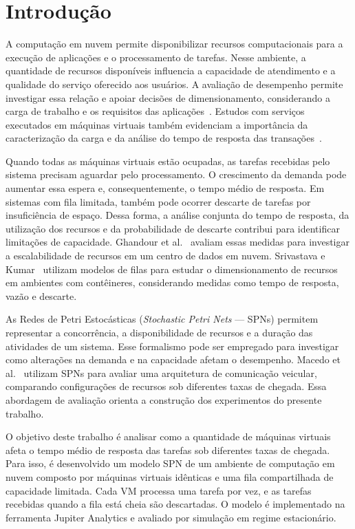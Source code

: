 \documentclass[conference]{IEEEtran}
\begin{document}
\section{Introdução}
\label{sec:introducao}

A computação em nuvem permite disponibilizar recursos computacionais para a execução de aplicações e o processamento de tarefas. Nesse ambiente, a quantidade de recursos disponíveis influencia a capacidade de atendimento e a qualidade do serviço oferecido aos usuários. A avaliação de desempenho permite investigar essa relação e apoiar decisões de dimensionamento, considerando a carga de trabalho e os requisitos das aplicações~\cite{ghandour2023computing}. Estudos com serviços executados em máquinas virtuais também evidenciam a importância da caracterização da carga e da análise do tempo de resposta das transações~\cite{juiz2023case}.

Quando todas as máquinas virtuais estão ocupadas, as tarefas recebidas pelo sistema precisam aguardar pelo processamento. O crescimento da demanda pode aumentar essa espera e, consequentemente, o tempo médio de resposta. Em sistemas com fila limitada, também pode ocorrer descarte de tarefas por insuficiência de espaço. Dessa forma, a análise conjunta do tempo de resposta, da utilização dos recursos e da probabilidade de descarte contribui para identificar limitações de capacidade. Ghandour et al.~\cite{ghandour2023computing} avaliam essas medidas para investigar a escalabilidade de recursos em um centro de dados em nuvem. Srivastava e Kumar~\cite{srivastava2023queueing} utilizam modelos de filas para estudar o dimensionamento de recursos em ambientes com contêineres, considerando medidas como tempo de resposta, vazão e descarte.

As Redes de Petri Estocásticas (\textit{Stochastic Petri Nets} --- SPNs) permitem representar a concorrência, a disponibilidade de recursos e a duração das atividades de um sistema. Esse formalismo pode ser empregado para investigar como alterações na demanda e na capacidade afetam o desempenho. Macedo et al.~\cite{macedo2022vanets} utilizam SPNs para avaliar uma arquitetura de comunicação veicular, comparando configurações de recursos sob diferentes taxas de chegada. Essa abordagem de avaliação orienta a construção dos experimentos do presente trabalho.

O objetivo deste trabalho é analisar como a quantidade de máquinas virtuais afeta o tempo médio de resposta das tarefas sob diferentes taxas de chegada. Para isso, é desenvolvido um modelo SPN de um ambiente de computação em nuvem composto por máquinas virtuais idênticas e uma fila compartilhada de capacidade limitada. Cada VM processa uma tarefa por vez, e as tarefas recebidas quando a fila está cheia são descartadas. O modelo é implementado na ferramenta Jupiter Analytics e avaliado por simulação em regime estacionário.
\end{document}
